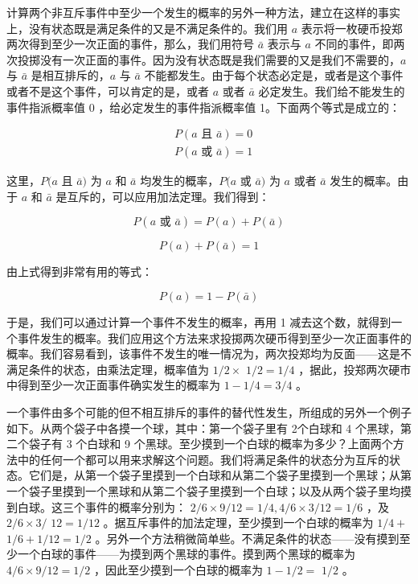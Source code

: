 计算两个非互斥事件中至少一个发生的概率的另外一种方法，建立在这样的事实上，没有状态既是满足条件的又是不满足条件的。我们用 $a$ 表示将一枚硬币投郑两次得到至少一次正面的事件，那么，我们用符号 $\bar{a}$ 表示与 $a$ 不同的事件，即两次投掷没有一次正面的事件。因为没有状态既是我们需要的又是我们不需要的，$a$ 与 $\bar{a}$ 是相互排斥的，$a$ 与 $\bar{a}$ 不能都发生。由于每个状态必定是，或者是这个事件或者不是这个事件，可以肯定的是，或者 $a$ 或者 $\bar{a}$ 必定发生。我们给不能发生的事件指派概率值 0 ，给必定发生的事件指派概率值 1。下面两个等式是成立的：

$$
\begin{aligned}
& P(a \text { 且 } \bar{a})=0 \\
& P(a \text { 或 } \bar{a})=1
\end{aligned}
$$

这里，$P(a$ 且 $\bar{a})$ 为 $a$ 和 $\bar{a}$ 均发生的概率，$P(a$ 或 $\bar{a})$ 为 $a$ 或者 $\bar{a}$ 发生的概率。由于 $a$ 和 $\bar{a}$ 是互斥的，可以应用加法定理。我们得到：

$$
P(a \text { 或 } \bar{a})=P(a)+P(\bar{a})
$$

$$
P(a)+P(\bar{a})=1
$$

由上式得到非常有用的等式：

$$
P(a)=1-P(\bar{a})
$$

于是，我们可以通过计算一个事件不发生的概率，再用 1 减去这个数，就得到一个事件发生的概率。我们应用这个方法来求投掷两次硬币得到至少一次正面事件的概率。我们容易看到，该事件不发生的唯一情况为，两次投郑均为反面——这是不满足条件的状态，由乘法定理，概率值为 $1 / 2 \times$ $1 / 2=1 / 4$ ，据此，投郑两次硬市中得到至少一次正面事件确实发生的概率为 $1-1 / 4=3 / 4$ 。

一个事件由多个可能的但不相互排斥的事件的替代性发生，所组成的另外一个例子如下。从两个袋子中各摸一个球，其中：第一个袋子里有 2个白球和 4 个黑球，第二个袋子有 3 个白球和 9 个黑球。至少摸到一个白球的概率为多少？上面两个方法中的任何一个都可以用来求解这个问题。我们将满足条件的状态分为互斥的状态。它们是，从第一个袋子里摸到一个白球和从第二个袋子里摸到一个黑球；从第一个袋子里摸到一个黑球和从第二个袋子里摸到一个白球；以及从两个袋子里均摸到白球。这三个事件的概率分别为： $2 / 6 \times 9 / 12=1 / 4,4 / 6 \times 3 / 12=1 / 6$ ，及 $2 / 6 \times 3 /$ $12=1 / 12$ 。据互斥事件的加法定理，至少摸到一个白球的概率为 $1 / 4+$ $1 / 6+1 / 12=1 / 2$ 。另外一个方法稍微简单些。不满足条件的状态——没有摸到至少一个白球的事件——为摸到两个黑球的事件。摸到两个黑球的概率为 $4 / 6 \times 9 / 12=1 / 2$ ，因此至少摸到一个白球的概率为 $1-1 / 2=$ $1 / 2$ 。

